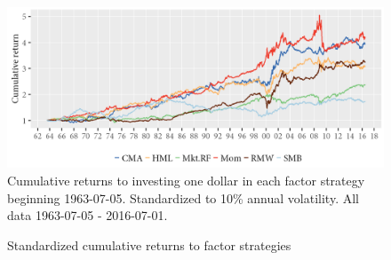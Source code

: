 \begin{figure}[H]
  \caption{Standardized cumulative returns to factor strategies}
  \label{diag:cumretstd}
  \centering
  \begin{minipage}{\textwidth}
  \includegraphics[scale=1]{graphics/cumretStdPlot.png}  
  \vspace{3mm}
  \footnotesize
  Cumulative returns to investing one dollar in each factor strategy beginning 1963-07-05. Standardized to 10\% annual volatility. All data 1963-07-05 - 2016-07-01.
  \end{minipage}
\end{figure}
